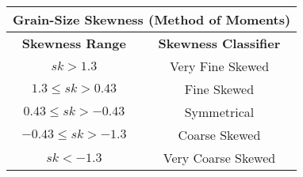 \documentclass[10pt]{article}
\begin{document}
\begin{center}
\begin{tabular}{ c c  }
\multicolumn{2}{c}{\textbf{Grain-Size Skewness (Method of Moments) }} \\
\hline
\textbf{Skewness Range} & \textbf{Skewness Classifier}  \\
\hline
$sk > 1.3 $               &  Very Fine Skewed   \\ 
$1.3 \le sk > 0.43 $    &  Fine Skewed   \\  
$0.43 \le sk > -0.43 $   &  Symmetrical  \\     
$-0.43 \le sk > -1.3 $    & Coarse Skewed    \\   
$sk < -1.3 $    & Very Coarse Skewed   \\
\end{tabular}
\end{center}
\end{document}

